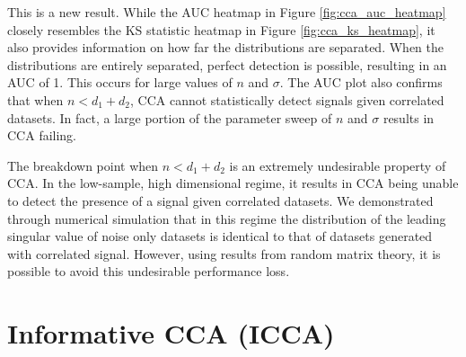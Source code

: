 This is a new result. While the AUC heatmap in Figure \ref{fig:cca_auc_heatmap} closely
resembles the KS statistic heatmap in Figure \ref{fig:cca_ks_heatmap}, it also provides
information on how far the distributions are separated. When the distributions are
entirely separated, perfect detection is possible, resulting in an AUC of 1. This occurs
for large values of $n$ and $\sigma$. The AUC plot also confirms that when $n<d_1+d_2$,
CCA cannot statistically detect signals given correlated datasets. In fact, a large
portion of the parameter sweep of $n$ and $\sigma$ results in CCA failing.

The breakdown point when $n<d_1+d_2$ is an extremely undesirable property of CCA. In the
low-sample, high dimensional regime, it results in CCA being unable to detect the presence
of a signal given correlated datasets. We demonstrated through numerical simulation that
in this regime the distribution of the leading singular value of noise only datasets is
identical to that of datasets generated with correlated signal. However, using results
from random matrix theory, it is possible to avoid this undesirable performance loss.

\section{Informative CCA (ICCA)}

